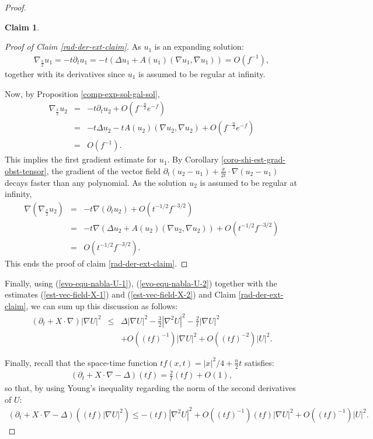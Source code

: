 \documentclass[a4paper,11pt,reqno]{amsart}
\newtheorem{claim}{Claim}
\begin{document}
\begin{proof}
\begin{claim}
\end{claim}

\begin{proof}[Proof of Claim \ref{rad-der-ext-claim}]
As $u_1$ is an expanding solution: 
\begin{eqnarray*}
\nabla_{\frac{x}{2}}u_1=-t\partial_tu_1=-t(\Delta u_1+A(u_1)(\nabla u_1,\nabla u_1))=\textit{O}(f^{-1}),
\end{eqnarray*}
together with its derivatives since $u_1$ is assumed to be regular at infinity.

Now, by Proposition \ref{comp-exp-sol-gal-sol},
\begin{eqnarray*}
\nabla_{\frac{x}{2}}u_2&=&-t\partial_tu_2+\textit{O}\left(f^{-\frac{n}{2}}e^{-f}\right)\\
&=&-t\Delta u_2-tA(u_2)(\nabla u_2,\nabla u_2)+\textit{O}\left(f^{-\frac{n}{2}}e^{-f}\right)\\
&=&\textit{O}(f^{-1}).
\end{eqnarray*}
This implies the first gradient estimate for $u_1$.
By Corollary \ref{coro-shi-est-grad-obst-tensor},  the gradient of the vector field $\partial_t(u_2-u_1)+\frac{x}{2t}\cdot\nabla (u_2-u_1)$ decays faster than any polynomial. As the solution $u_2$ is assumed to be regular at infinity,
\begin{eqnarray*}
\nabla\left(\nabla_{\frac{x}{2}}u_2\right)&=&-t\nabla\left(\partial_tu_2\right)+\textit{O}\left(t^{-1/2}f^{-3/2}\right)\\
&=&-t\nabla\left(\Delta u_2+A(u_2)(\nabla u_2,\nabla u_2)\right)+\textit{O}\left(t^{-1/2}f^{-3/2}\right)\\
&=&\textit{O}(t^{-1/2}f^{-3/2}).
\end{eqnarray*}
This ends the proof of claim \ref{rad-der-ext-claim}.
\end{proof}


Finally, using (\ref{evo-equ-nabla-U-1}), (\ref{evo-equ-nabla-U-2}) together with the estimates (\ref{est-vec-field-X-1}) and (\ref{est-vec-field-X-2}) and Claim \ref{rad-der-ext-claim}, we can sum up this discussion as follows:
\begin{eqnarray*}
\left(\partial_t+X\cdot\nabla \right)|\nabla U|^2&\leq&\Delta|\nabla U|^2-\frac{3}{2}|\nabla^2U|^2-\frac{2}{t}|\nabla U|^2\\&&+\textit{O}\left((tf)^{-1}\right)|\nabla U|^2+\textit{O}\left((tf)^{-2}\right)|U|^2.
\end{eqnarray*}

Finally, recall that the space-time function $tf(x,t)=|x|^2/4+\frac{n}{2}t$ satisfies:
\begin{eqnarray*}
\left(\partial_t+X\cdot\nabla-\Delta \right)(tf)=\frac{2}{t}(tf)+\textit{O}(1),
\end{eqnarray*}
so that, by using Young's inequality regarding the norm of the second derivatives of $U$:
\begin{eqnarray*}
\left(\partial_t+X\cdot\nabla-\Delta \right)((tf)|\nabla U|^2)\leq-(tf)|\nabla^2U|^2+\textit{O}\left((tf)^{-1}\right)(tf)|\nabla U|^2+\textit{O}\left((tf)^{-1}\right)|U|^2.
\end{eqnarray*}


\end{proof}
\end{document}
